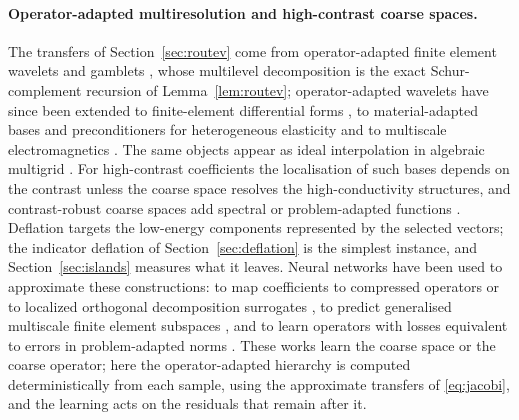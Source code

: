 \paragraph{Operator-adapted multiresolution and high-contrast coarse spaces.} The transfers of Section~\ref{sec:routev} come
from operator-adapted finite element wavelets \cite{sudarshan2003,sudarshan2005proc,amaratunga2006,sudarshan2006,sudarshan2005thesis,dheedene2005thesis}
and gamblets
\cite{owhadi2017,owhadi2019book}, whose multilevel decomposition is the exact Schur-complement recursion of
Lemma~\ref{lem:routev}; operator-adapted wavelets have since been extended to finite-element differential forms
\cite{budninskiy2019}, to material-adapted bases and preconditioners for heterogeneous elasticity \cite{chen2019tog,chen2021tog}
and to multiscale electromagnetics \cite{sik2025}. The same objects appear as ideal interpolation in algebraic multigrid \cite{vanek1996,xu2017acta}.
For high-contrast coefficients the localisation of such bases depends on the contrast unless the coarse space resolves the
high-conductivity structures, and contrast-robust coarse spaces add spectral or problem-adapted functions
\cite{malqvist2014,kornhuber2018,peterseim2016,hellman2017,galvis2010,spillane2014geneo,babuska2011,chung2018cem,ma2022}.
Deflation \cite{frank2001,tang2009} targets the low-energy components represented by the selected vectors; the indicator deflation of
Section~\ref{sec:deflation} is the simplest instance, and Section~\ref{sec:islands} measures what it leaves. Neural networks
have been used to approximate these constructions: to map coefficients to compressed operators or to localized orthogonal
decomposition surrogates \cite{kropfl2021,kropfl2022,kropfl2025}, to predict generalised multiscale finite element subspaces
\cite{rudikov2025lsino}, and to learn operators with losses equivalent to errors in problem-adapted norms \cite{qiu2025}.
These works learn the coarse space or the coarse operator; here the operator-adapted hierarchy is computed deterministically from each
sample, using the approximate transfers of \eqref{eq:jacobi}, and the learning acts on the residuals that remain after it.
